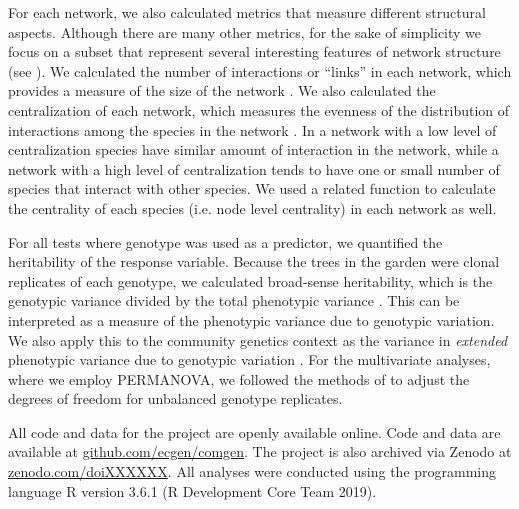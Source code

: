 \documentclass[11pt,twocolumn,twoside,lineno]{pnas-new}
\begin{document}
{For each network, we also calculated metrics that measure different
structural aspects. Although there are many other metrics, for the
sake of simplicity we focus on a subset that represent several
interesting features of network structure (see \citep{Lau2017a}). We
calculated the number of interactions or ``links'' in each network,
which provides a measure of the size of the network \citep{Lau2015a,
  Borrett2014EnaR:Analysis}. We also calculated the centralization of
each network, which measures the evenness of the distribution of
interactions among the species in the network \cite{sna}. In a network
with a low level of centralization species have similar amount of
interaction in the network, while a network with a high level of
centralization tends to have one or small number of species that
interact with other species. We used a related function to calculate
the centrality of each species (i.e. node level centrality) in each
network as well.

For all tests where genotype was used as a predictor, we quantified
the heritability of the response variable. Because the trees in the
garden were clonal replicates of each genotype, we calculated
broad-sense heritability, which is the genotypic variance divided by
the total phenotypic variance \cite{Conner2004ATextbook}. This can be
interpreted as a measure of the phenotypic variance due to genotypic
variation. We also apply this to the community genetics context as the
variance in \textit{extended} phenotypic variance due to genotypic
variation \cite{DawkinsTheGene}. For the multivariate analyses, where
we employ PERMANOVA, we followed the methods of
\citep{Shuster2006COMMUNITYSTRUCTURE} to adjust the degrees of freedom
for unbalanced genotype replicates.

All code and data for the project are openly available online. Code
and data are available at \url{github.com/ecgen/comgen}. The project
is also archived via Zenodo at \url{zenodo.com/doiXXXXXX}. All
analyses were conducted using the programming language R version 3.6.1
(R Development Core Team 2019).

}
\end{document}
